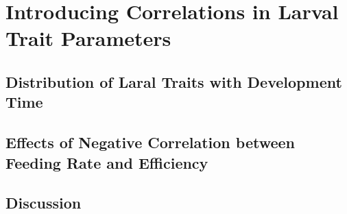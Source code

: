 \chapter{Introducing Correlations in Larval Trait Parameters}

\section{Distribution of Laral Traits with Development Time}

\section{Effects of Negative Correlation between Feeding Rate and Efficiency}

\section{Discussion}

\pagebreak
\renewcommand\bibname{{References}}


